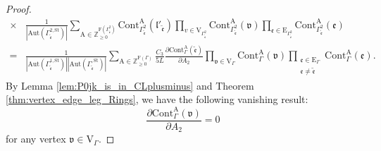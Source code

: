 \documentclass[12pt]{amsart}
\numberwithin{equation}{section}
\begin{document}
\begin{proof}
\begin{equation}
\begin{aligned}
\times&\frac{1}{|\mathrm{Aut}(\Gamma_{\tilde{\mathfrak{e}}}^{2,\mathrm{St}})|} \sum_{\mathrm{A} \in \mathbb{Z}_{\geq 0}^{\mathrm{F}({\Gamma_{\tilde{\mathfrak{e}}}^2})}} \mathrm{Cont}_{\Gamma_{\tilde{\mathfrak{e}}}^2}^{\mathrm{A}}(\mathfrak{l}'_{\tilde{\mathfrak{e}}}) \prod_{v \in \mathrm{V}_{\Gamma_{\tilde{\mathfrak{e}}}^2}} \mathrm{Cont}_{\Gamma_{\tilde{\mathfrak{e}}}^2}^{\mathrm{A}}(\mathfrak{v}) \prod_{\mathfrak{e} \in \mathrm{E}_{\Gamma_{\tilde{\mathfrak{e}}}^2}} \mathrm{Cont}_{\Gamma_{\tilde{\mathfrak{e}}}^2}^{\mathrm{A}}(\mathfrak{e})\\
=&\frac{1}{|\mathrm{Aut}(\Gamma_{\tilde{\mathfrak{e}}}^{1,\mathrm{St}})||\mathrm{Aut}(\Gamma_{\tilde{\mathfrak{e}}}^{,\mathrm{St}})|} \sum_{\mathrm{A} \in \mathbb{Z}_{\geq 0}^{\mathrm{F}(\Gamma)}}\frac{C_{3}}{5L}\frac{\partial \mathrm{Cont}_{\Gamma}^{\mathrm{A}}(\tilde{\mathfrak{e}}) }{\partial A_2} \prod_{\mathfrak{v} \in \mathrm{V}_{\Gamma}} \mathrm{Cont}_{\Gamma}^{\mathrm{A}}(\mathfrak{v}) \prod_{\substack{
\mathfrak{e} \in \mathrm{E}_{\Gamma} \\ \mathfrak{e}\neq \tilde{\mathfrak{e}}}} \mathrm{Cont}_{\Gamma}^{\mathrm{A}}(\mathfrak{e}).
\end{aligned}
\end{equation}
By Lemma \ref{lem:P0jk_is_in_CLplusminus} and Theorem \ref{thm:vertex_edge_leg_Rings}, we have the following vanishing result:
\begin{equation*}
\frac{\partial \mathrm{Cont}_{\Gamma}^{\mathrm{A}}(\mathfrak{v}) }{\partial A_2}=0
\end{equation*}
for any vertex $\mathfrak{v}\in\mathrm{V}_{\Gamma} $.


\end{proof}
\end{document}
